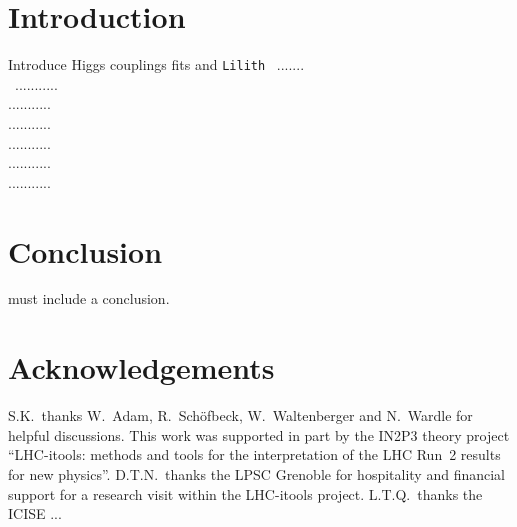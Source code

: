 \documentclass[submission, Phys]{SciPost}
\begin{document}


\section{Introduction} \label{sec:intro}

Introduce Higgs couplings fits and  {\tt Lilith}~\cite{Bernon:2015hsa} .......  \\\
...........\\
...........\\
...........\\
...........\\
...........\\
...........\\













\section{Conclusion}
 must include a conclusion.

\section*{Acknowledgements}

S.K.~thanks W.~Adam, R.~Sch\"ofbeck, W.~Waltenberger and N.~Wardle for helpful discussions. 
This work was supported in part by the IN2P3 theory project 
``LHC-itools: methods and tools for the interpretation of the LHC Run~2 results for new physics''. 
D.T.N.\ thanks the LPSC Grenoble for hospitality and financial support for a research visit within the LHC-itools project. 
L.T.Q.\ thanks the ICISE ...
\end{document}
